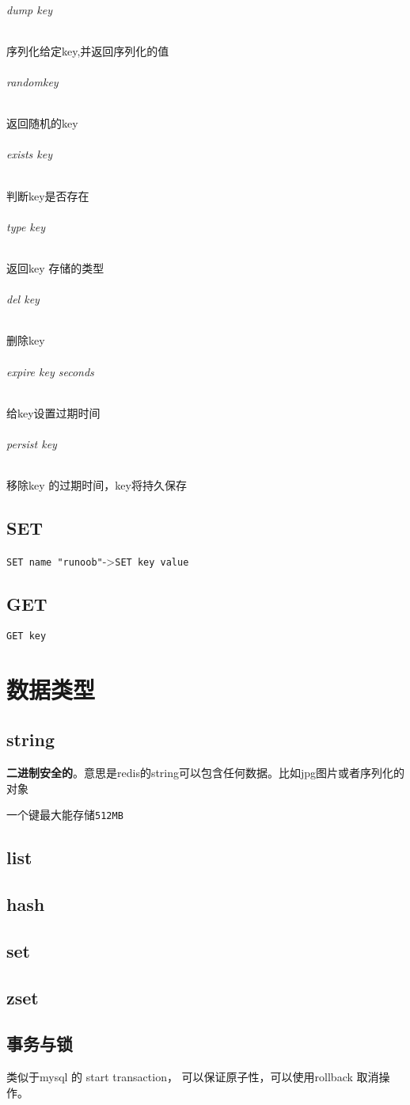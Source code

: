 \documentclass[UTF8,a4paper,12pt]{ctexbook}
\begin{document}
		\subparagraph{dump key } 序列化给定key,并返回序列化的值
		
		\subparagraph{randomkey} 返回随机的key
		
		\subparagraph{exists key} 判断key是否存在
		
		\subparagraph{type key} 返回key 存储的类型
		
		\subparagraph{del key} 删除key
		
		\subparagraph{expire key seconds} 给key设置过期时间
		
		\subparagraph{persist key} 移除key 的过期时间，key将持久保存
		
	\section{SET}\verb|SET name "runoob"|->\verb|SET key value|
		
	\section{GET}\verb|GET key|
	

\chapter{数据类型}	
	\section{string}
		\textbf{二进制安全的}。意思是redis的string可以包含任何数据。比如jpg图片或者序列化的对象 
		
		一个键最大能存储\verb|512MB|
		
	\section{list}
	
	\section{hash}
	
	\section{set}
	
	\section{zset}
	
	\section{事务与锁}
		类似于mysql 的 start transaction， 可以保证原子性，可以使用rollback 取消操作。
		
\end{document}
